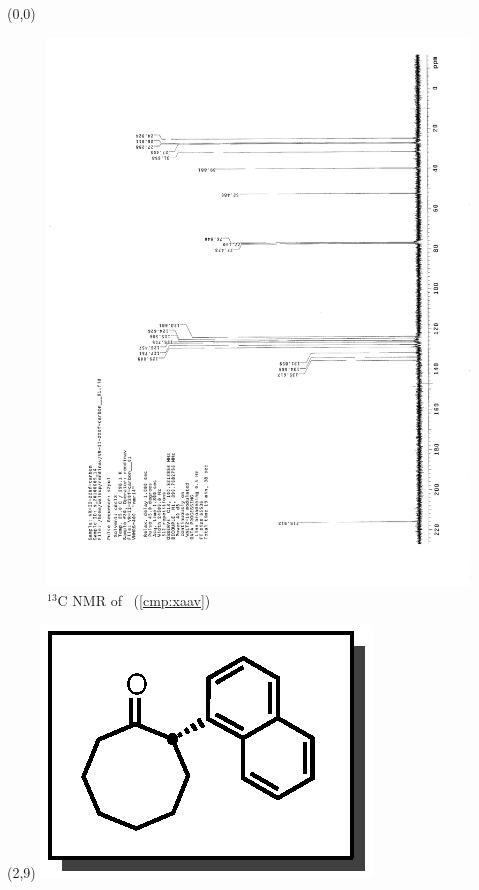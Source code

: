 \clearpage
\begin{textblock}{20}(0,0)
\begin{figure}[htb]
\caption{$^{13}$C NMR of  \CMPxaav\ (\ref{cmp:xaav})}
\includegraphics[scale=0.75, trim = 0mm 0mm 0mm 5mm,
clip]{chp_asymmetric/images/nmr/xaavC}
\vspace{-100pt}
\end{figure}
\end{textblock}
\begin{textblock}{1}(2,9)
\includegraphics[scale=0.8, angle=90]{chp_asymmetric/images/xaav}
\end{textblock}
\clearpage

